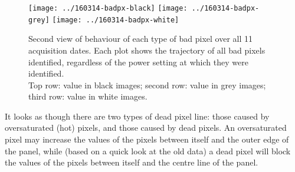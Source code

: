 \documentclass[10pt,fleqn]{article}
\begin{document}
\begin{figure}[!h]
\caption{Second view of behaviour of each type of bad pixel over all 11 acquisition dates. 
Each plot shows the trajectory of all bad pixels identified, regardless of the power setting at which they were identified.\\
 Top row: value in black images; second row: value in grey images; third row: value in white images.}
\texttt{[image: ../160314-badpx-black]}
\texttt{[image: ../160314-badpx-grey]}
\texttt{[image: ../160314-badpx-white]}
\end{figure}





It looks as though there are two types of dead pixel line: those caused by oversaturated (hot) pixels, and those caused by dead pixels. An oversaturated pixel may increase the values of the pixels between itself and the outer edge of the panel, while (based on a quick look at the old data) a dead pixel will block the values of the pixels between itself and the centre line of the panel.


\end{document}
